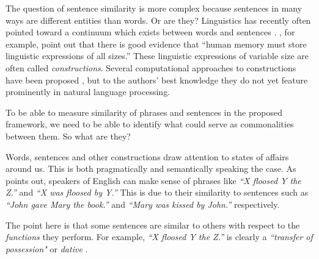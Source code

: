\documentclass[11pt]{article}
\begin{document}
The question of sentence similarity is more complex because sentences in many ways are different entities than words. Or are they? Linguistics has recently often pointed toward a continuum which exists between words and sentences \cite{jackendoff2012cambridge}. , for example, point out that there is good evidence that ``human memory must store linguistic expressions of all sizes.'' These linguistic expressions of variable size are often called \emph{constructions}. Several computational approaches to constructions have been proposed \cite{Gaspers2011,chang2012computational}, but to the authors' best knowledge they do not yet feature prominently in natural language processing.

To be able to measure similarity of phrases and sentences in the proposed framework, we need to be able to identify what could serve as commonalities between them. So what are they?

Words, sentences and other constructions draw attention to states of affairs around us. This is both pragmatically and semantically speaking the case. As  points out, speakers of English can make sense of phrases like \textit{``X floosed Y the Z.''} and \textit{``X was floosed by Y.''} This is due to their similarity to sentences such as \textit{``John gave Mary the book.''} and \textit{``Mary was kissed by John.''} respectively.

The point here is that some sentences are similar to others with respect to the \emph{functions} they perform. For example, \textit{``X floosed Y the Z.''} is clearly a \emph{``transfer of possession"} or \emph{dative} \cite{bresnan2007predicting}.

\end{document}
